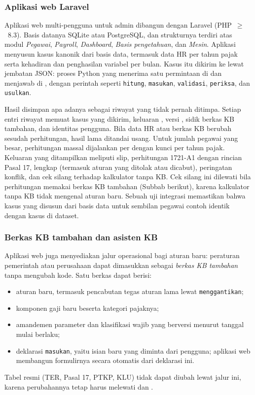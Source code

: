 \subsubsection{Aplikasi web Laravel}
Aplikasi web multi-pengguna untuk admin  dibangun dengan Laravel (PHP~$\ge$~8.3). Basis datanya SQLite atau PostgreSQL, dan strukturnya terdiri atas modul \emph{Pegawai}, \emph{Payroll}, \emph{Dashboard}, \emph{Basis pengetahuan}, dan \emph{Mesin}. Aplikasi menyusun kasus kanonik dari basis data, termasuk data HR per tahun pajak serta kehadiran dan penghasilan variabel per bulan. Kasus itu dikirim ke  lewat jembatan JSON: proses Python yang menerima satu permintaan di  dan menjawab di , dengan perintah seperti \texttt{hitung}, \texttt{masukan}, \texttt{validasi}, \texttt{periksa}, dan \texttt{usulkan}.

Hasil  disimpan apa adanya sebagai riwayat yang tidak pernah ditimpa. Setiap entri riwayat memuat kasus yang dikirim, keluaran , versi , sidik berkas KB tambahan, dan identitas pengguna. Bila data HR atau berkas KB berubah sesudah perhitungan, hasil lama ditandai usang. Untuk jumlah pegawai yang besar, perhitungan massal dijalankan per  dengan kunci per tahun pajak. Keluaran yang ditampilkan meliputi slip, perhitungan 1721-A1 dengan rincian Pasal 17,  lengkap (termasuk aturan yang ditolak atau dicabut), peringatan konflik, dan cek silang terhadap kalkulator tanpa KB. Cek silang ini dilewati bila perhitungan memakai berkas KB tambahan (Subbab berikut), karena kalkulator tanpa KB tidak mengenal aturan baru. Sebuah uji integrasi memastikan bahwa kasus yang disusun dari basis data untuk sembilan pegawai contoh identik dengan kasus di dataset.

\subsubsection{Berkas KB tambahan dan asisten KB}
Aplikasi web juga menyediakan jalur operasional bagi aturan baru: peraturan pemerintah atau perusahaan dapat dimasukkan sebagai \emph{berkas KB tambahan} tanpa mengubah kode. Satu berkas dapat berisi:
\begin{itemize}[leftmargin=*,nosep]
  \item aturan baru, termasuk pencabutan tegas aturan lama lewat \texttt{menggantikan};
  \item komponen gaji baru beserta kategori pajaknya;
  \item amandemen parameter dan klasifikasi wajib yang berversi menurut tanggal mulai berlaku;
  \item deklarasi \texttt{masukan}, yaitu isian baru yang diminta dari pengguna; aplikasi web membangun formulirnya secara otomatis dari deklarasi ini.
\end{itemize}
Tabel resmi (TER, Pasal 17, PTKP, KLU) tidak dapat diubah lewat jalur ini, karena perubahannya tetap harus melewati  dan .

